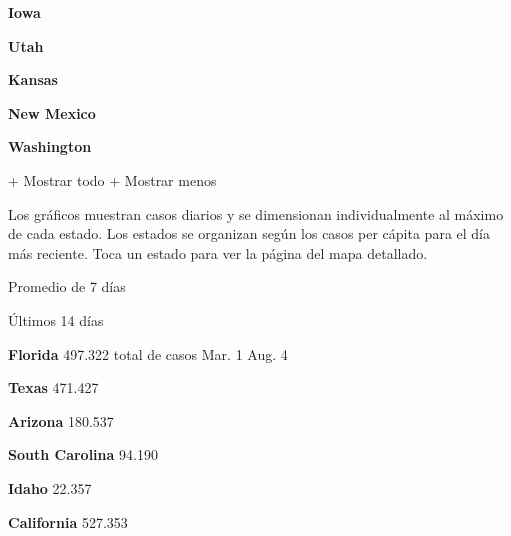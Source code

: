 \textbf{Iowa}

\href{https://www.nytimes3xbfgragh.onion/interactive/2020/us/utah-coronavirus-cases.html}{}

\textbf{Utah}

\href{https://www.nytimes3xbfgragh.onion/interactive/2020/us/kansas-coronavirus-cases.html}{}

\textbf{Kansas}

\href{https://www.nytimes3xbfgragh.onion/interactive/2020/us/new-mexico-coronavirus-cases.html}{}

\textbf{New Mexico}

\href{https://www.nytimes3xbfgragh.onion/interactive/2020/us/washington-coronavirus-cases.html}{}

\textbf{Washington}

+ Mostrar todo + Mostrar menos

Los gráficos muestran casos diarios y se dimensionan individualmente al
máximo de cada estado. Los estados se organizan según los casos per
cápita para el día más reciente. Toca un estado para ver la página del
mapa detallado.

\href{https://www.nytimes3xbfgragh.onion/interactive/2020/us/florida-coronavirus-cases.html}{}

Promedio de 7 días

Últimos 14 días

\textbf{Florida} 497.322 total de casos Mar. 1 Aug. 4

\href{https://www.nytimes3xbfgragh.onion/interactive/2020/us/texas-coronavirus-cases.html}{}

\textbf{Texas} 471.427

\href{https://www.nytimes3xbfgragh.onion/interactive/2020/us/arizona-coronavirus-cases.html}{}

\textbf{Arizona} 180.537

\href{https://www.nytimes3xbfgragh.onion/interactive/2020/us/south-carolina-coronavirus-cases.html}{}

\textbf{South Carolina} 94.190

\href{https://www.nytimes3xbfgragh.onion/interactive/2020/us/idaho-coronavirus-cases.html}{}

\textbf{Idaho} 22.357

\href{https://www.nytimes3xbfgragh.onion/interactive/2020/us/california-coronavirus-cases.html}{}

\textbf{California} 527.353

\href{https://www.nytimes3xbfgragh.onion/interactive/2020/us/iowa-coronavirus-cases.html}{}

